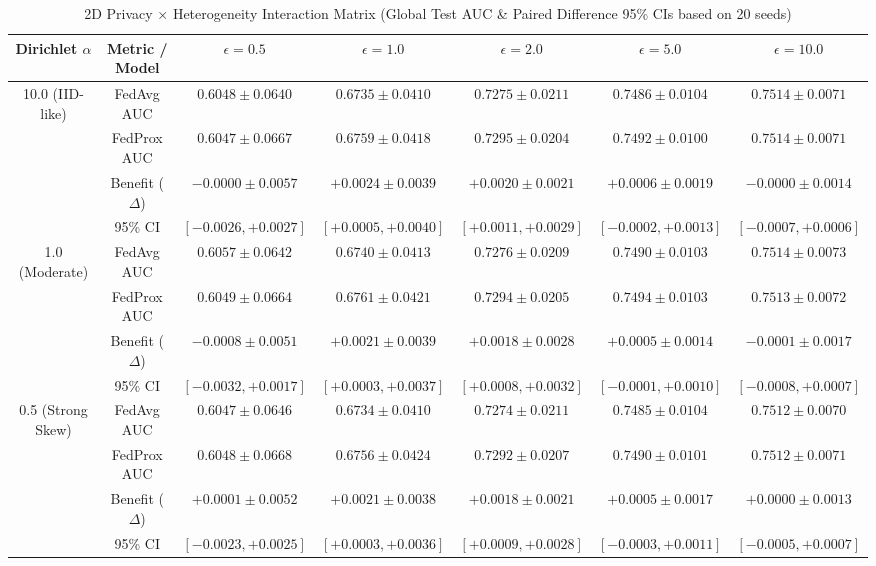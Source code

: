 \documentclass[conference]{IEEEtran}
\begin{document}
\begin{table}[t]
\caption{2D Privacy × Heterogeneity Interaction Matrix (Global Test AUC \& Paired Difference 95\% CIs based on 20 seeds)}
\centering
\begin{tabular}{ccccccc}
\toprule
Dirichlet $\alpha$ & Metric / Model & $\epsilon=0.5$ & $\epsilon=1.0$ & $\epsilon=2.0$ & $\epsilon=5.0$ & $\epsilon=10.0$ \\
\midrule
10.0 (IID-like) & FedAvg AUC & $0.6048 \pm 0.0640$ & $0.6735 \pm 0.0410$ & $0.7275 \pm 0.0211$ & $0.7486 \pm 0.0104$ & $0.7514 \pm 0.0071$ \\
                & FedProx AUC & $0.6047 \pm 0.0667$ & $0.6759 \pm 0.0418$ & $0.7295 \pm 0.0204$ & $0.7492 \pm 0.0100$ & $0.7514 \pm 0.0071$ \\
                & Benefit ($\Delta$) & $-0.0000 \pm 0.0057$ & $+0.0024 \pm 0.0039$ & $+0.0020 \pm 0.0021$ & $+0.0006 \pm 0.0019$ & $-0.0000 \pm 0.0014$ \\
                & 95\% CI & $[-0.0026, +0.0027]$ & $[+0.0005, +0.0040]$ & $[+0.0011, +0.0029]$ & $[-0.0002, +0.0013]$ & $[-0.0007, +0.0006]$ \\
\midrule
1.0 (Moderate)  & FedAvg AUC & $0.6057 \pm 0.0642$ & $0.6740 \pm 0.0413$ & $0.7276 \pm 0.0209$ & $0.7490 \pm 0.0103$ & $0.7514 \pm 0.0073$ \\
                & FedProx AUC & $0.6049 \pm 0.0664$ & $0.6761 \pm 0.0421$ & $0.7294 \pm 0.0205$ & $0.7494 \pm 0.0103$ & $0.7513 \pm 0.0072$ \\
                & Benefit ($\Delta$) & $-0.0008 \pm 0.0051$ & $+0.0021 \pm 0.0039$ & $+0.0018 \pm 0.0028$ & $+0.0005 \pm 0.0014$ & $-0.0001 \pm 0.0017$ \\
                & 95\% CI & $[-0.0032, +0.0017]$ & $[+0.0003, +0.0037]$ & $[+0.0008, +0.0032]$ & $[-0.0001, +0.0010]$ & $[-0.0008, +0.0007]$ \\
\midrule
0.5 (Strong Skew)& FedAvg AUC & $0.6047 \pm 0.0646$ & $0.6734 \pm 0.0410$ & $0.7274 \pm 0.0211$ & $0.7485 \pm 0.0104$ & $0.7512 \pm 0.0070$ \\
                & FedProx AUC & $0.6048 \pm 0.0668$ & $0.6756 \pm 0.0424$ & $0.7292 \pm 0.0207$ & $0.7490 \pm 0.0101$ & $0.7512 \pm 0.0071$ \\
                & Benefit ($\Delta$) & $+0.0001 \pm 0.0052$ & $+0.0021 \pm 0.0038$ & $+0.0018 \pm 0.0021$ & $+0.0005 \pm 0.0017$ & $+0.0000 \pm 0.0013$ \\
                & 95\% CI & $[-0.0023, +0.0025]$ & $[+0.0003, +0.0036]$ & $[+0.0009, +0.0028]$ & $[-0.0003, +0.0011]$ & $[-0.0005, +0.0007]$ \\

\end{tabular}
\end{table}
\end{document}
